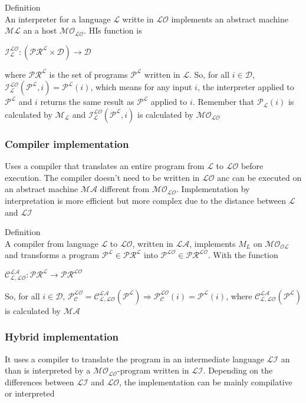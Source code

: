 \documentclass[12pt, a4paper]{article}
\begin{document}
Definition\\An interpreter for a language $\mathcal{L}$ writte in $\mathcal{LO}$ implements an abstract machine
$\mathcal{ML}$ an a host $\mathcal{MO_{LO}}$. HIs function is 
\begin{center}
    $\mathcal{I^{LO}_{L}:(PR^{L}\times D)\to D}$
\end{center}
where $\mathcal{PR^{L}}$ is the set of programs $\mathcal{P^{L}}$ written in $\mathcal{L}$. So, for all 
$i\in\mathcal{D}$, $\mathcal{I^{LO}_{L}}(\mathcal{P^{L}},i)=\mathcal{P^{L}}(i)$, which means for any input $i$, the
interpreter applied to $\mathcal{P^{L}}$ and $i$ returns the same result as $\mathcal{P^{L}}$ applied to $i$. Remember
that $\mathcal{P_{L}}(i)$ is calculated by $\mathcal{M_{L}}$ and $\mathcal{I^{LO}_{L}}(\mathcal{P^{L}},i)$ is 
calculated by $\mathcal{MO_{LO}}$

\subsubsection{Compiler implementation}
Uses a compiler that translates an entire program from $\mathcal{L}$ to $\mathcal{LO}$ before execution. The compiler
doesn't need to be written in $\mathcal{LO}$ anc can be executed on an abstract machine $\mathcal{MA}$ different from
$\mathcal{MO_{LO}}$. Implementation by interpretation is more efficient but more complex due to the distance between
$\mathcal{L}$ and $\mathcal{LI}$

Definition\\A compiler from language $\mathcal{L}$ to $\mathcal{LO}$, written in $\mathcal{LA}$, implements $M_{L}$
on $\mathcal{MO_{OL}}$ and transforms a program $\mathcal{P^{L}\in PR^{L}}$ into $\mathcal{P^{LO}\in PR^{LO}}$.
With the function
\begin{center}
    $\mathcal{C^{LA}_{L,LO}:PR^{L}\to PR^{LO}}$
\end{center}
So, for all $i\in\mathcal{D}$, $\mathcal{P^{LO}_{C}=C^{LA}_{L,LO}(P^{L})\Rightarrow P^{LO}_{C}}(i)=\mathcal{P^{L}}(i)$,
where $\mathcal{C^{LA}_{L,LO}(P^{L})}$ is calculated by $\mathcal{MA}$

\subsubsection{Hybrid implementation}
It uses a compiler to translate the program in an intermediate language $\mathcal{LI}$ an than is interpreted by a
$\mathcal{MO_{LO}}$-program written in $\mathcal{LI}$. Depending on the differences between $\mathcal{LI}$ and 
$\mathcal{LO}$, the implementation can be mainly compilative or interpreted
\end{document}
